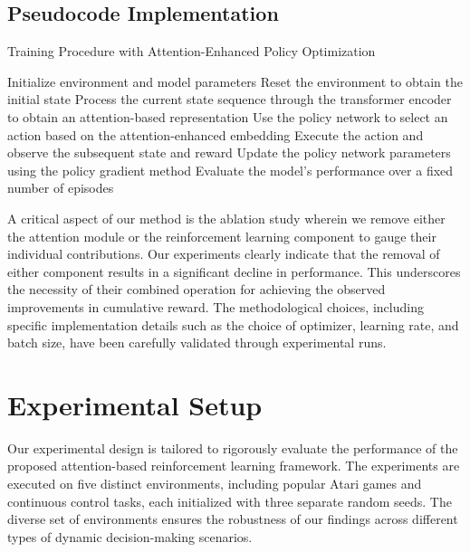 \subsection{Pseudocode Implementation}
\begin{algorithm}[H]
  \caption{Training Procedure with Attention-Enhanced Policy Optimization}
  \begin{algorithmic}[1]
    \State Initialize environment and model parameters
      \State Reset the environment to obtain the initial state
      \State Process the current state sequence through the transformer encoder to obtain an attention-based representation
      \State Use the policy network to select an action based on the attention-enhanced embedding
      \State Execute the action and observe the subsequent state and reward
      \State Update the policy network parameters using the policy gradient method
        \State Evaluate the model’s performance over a fixed number of episodes
      \EndIf
    \EndFor
  \end{algorithmic}
\end{algorithm}

A critical aspect of our method is the ablation study wherein we remove either the attention module or the reinforcement learning component to gauge their individual contributions. Our experiments clearly indicate that the removal of either component results in a significant decline in performance. This underscores the necessity of their combined operation for achieving the observed improvements in cumulative reward. The methodological choices, including specific implementation details such as the choice of optimizer, learning rate, and batch size, have been carefully validated through experimental runs.

\section{Experimental Setup}
\label{sec:experimental}
Our experimental design is tailored to rigorously evaluate the performance of the proposed attention-based reinforcement learning framework. The experiments are executed on five distinct environments, including popular Atari games and continuous control tasks, each initialized with three separate random seeds. The diverse set of environments ensures the robustness of our findings across different types of dynamic decision-making scenarios.

